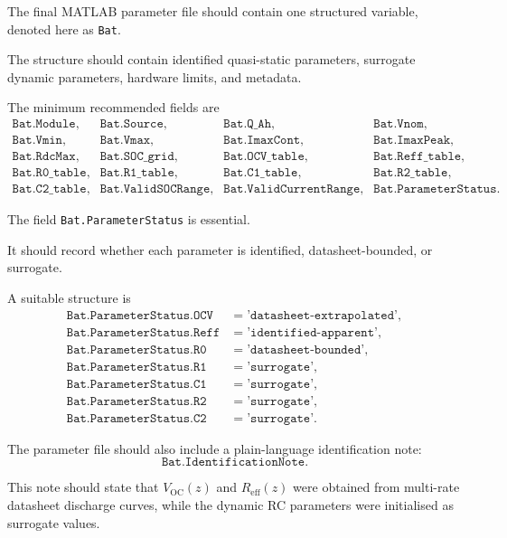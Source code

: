 \documentclass[a4paper,12pt]{article}
\begin{document}
The final MATLAB parameter file should contain one structured variable, denoted here as \texttt{Bat}.

The structure should contain identified quasi-static parameters, surrogate dynamic parameters, hardware limits, and metadata.

The minimum recommended fields are
\[
\begin{array}{llll}
\texttt{Bat.Module}, &
\texttt{Bat.Source}, &
\texttt{Bat.Q\_Ah}, &
\texttt{Bat.Vnom},\\
\texttt{Bat.Vmin}, &
\texttt{Bat.Vmax}, &
\texttt{Bat.ImaxCont}, &
\texttt{Bat.ImaxPeak},\\
\texttt{Bat.RdcMax}, &
\texttt{Bat.SOC\_grid}, &
\texttt{Bat.OCV\_table}, &
\texttt{Bat.Reff\_table},\\
\texttt{Bat.R0\_table}, &
\texttt{Bat.R1\_table}, &
\texttt{Bat.C1\_table}, &
\texttt{Bat.R2\_table},\\
\texttt{Bat.C2\_table}, &
\texttt{Bat.ValidSOCRange}, &
\texttt{Bat.ValidCurrentRange}, &
\texttt{Bat.ParameterStatus}.
\end{array}
\]

The field \texttt{Bat.ParameterStatus} is essential.

It should record whether each parameter is identified, datasheet-bounded, or surrogate.

A suitable structure is
\[
\begin{array}{ll}
\texttt{Bat.ParameterStatus.OCV}  & = \texttt{'datasheet-extrapolated'},\\
\texttt{Bat.ParameterStatus.Reff} & = \texttt{'identified-apparent'},\\
\texttt{Bat.ParameterStatus.R0}   & = \texttt{'datasheet-bounded'},\\
\texttt{Bat.ParameterStatus.R1}   & = \texttt{'surrogate'},\\
\texttt{Bat.ParameterStatus.C1}   & = \texttt{'surrogate'},\\
\texttt{Bat.ParameterStatus.R2}   & = \texttt{'surrogate'},\\
\texttt{Bat.ParameterStatus.C2}   & = \texttt{'surrogate'}.
\end{array}
\]

The parameter file should also include a plain-language identification note:
\[
\texttt{Bat.IdentificationNote}.
\]

This note should state that \(V_{\mathrm{OC}}(z)\) and \(R_{\mathrm{eff}}(z)\) were obtained from multi-rate datasheet discharge curves, while the dynamic RC parameters were initialised as surrogate values.
\end{document}
